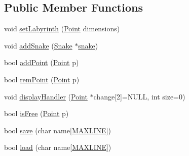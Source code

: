 \subsection*{Public Member Functions}
\begin{DoxyCompactItemize}
\item 
void \mbox{\hyperlink{class_labyrinth_a39e1b11a06d126328131d387fbf51d73}{set\+Labyrinth}} (\mbox{\hyperlink{common_8h_aa9cfdb80b4ca12013a2de8a3b9b97981}{Point}} dimensions)
\item 
void \mbox{\hyperlink{class_labyrinth_ad2819aba76d079c7fda751e7388b7182}{add\+Snake}} (\mbox{\hyperlink{class_snake}{Snake}} $\ast$\mbox{\hyperlink{class_labyrinth_a09a46368bfd83ccb75580687cb17b92f}{snake}})
\item 
bool \mbox{\hyperlink{class_labyrinth_a710cf4ff7789d527e6081d1eb2d696a6}{add\+Point}} (\mbox{\hyperlink{common_8h_aa9cfdb80b4ca12013a2de8a3b9b97981}{Point}} p)
\item 
bool \mbox{\hyperlink{class_labyrinth_a24d98083c011da23695425ec69d583a5}{rem\+Point}} (\mbox{\hyperlink{common_8h_aa9cfdb80b4ca12013a2de8a3b9b97981}{Point}} p)
\item 
void \mbox{\hyperlink{class_labyrinth_a02c42abb1b58fdf8a20b66bddd0bbe00}{display\+Handler}} (\mbox{\hyperlink{common_8h_aa9cfdb80b4ca12013a2de8a3b9b97981}{Point}} $\ast$change\mbox{[}2\mbox{]}=N\+U\+LL, int size=0)
\item 
bool \mbox{\hyperlink{class_labyrinth_acd7311e3222304bae2208fbc293bcc4d}{is\+Free}} (\mbox{\hyperlink{common_8h_aa9cfdb80b4ca12013a2de8a3b9b97981}{Point}} p)
\item 
bool \mbox{\hyperlink{class_labyrinth_a99e6b33f94d6d64f9c5a4fa78f08c007}{save}} (char name\mbox{[}\mbox{\hyperlink{common_8h_a3e937c42922f7601edb17b747602c471}{M\+A\+X\+L\+I\+NE}}\mbox{]})
\item 
bool \mbox{\hyperlink{class_labyrinth_a36cd7033292515cba0ce3d74f03720b6}{load}} (char name\mbox{[}\mbox{\hyperlink{common_8h_a3e937c42922f7601edb17b747602c471}{M\+A\+X\+L\+I\+NE}}\mbox{]})
\end{DoxyCompactItemize}
